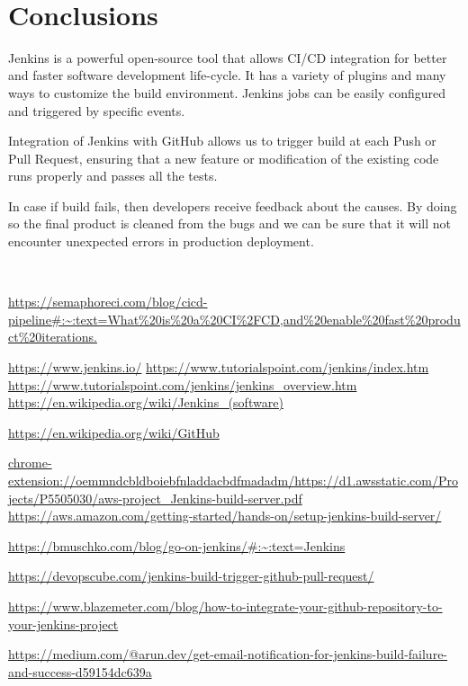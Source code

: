 \documentclass[12pt,a4paper,twoside]{article}
\begin{document}
~\newpage


\section{Conclusions}

Jenkins is a powerful open-source tool that allows CI/CD integration for better and faster software development life-cycle. It has a variety of plugins and many ways to customize the build environment. Jenkins jobs can be easily configured and triggered by specific events. 

Integration of Jenkins with GitHub allows us to trigger build at each Push or Pull Request, ensuring that a new feature or modification of the existing code runs properly and passes all the tests. 

In case if build fails, then developers receive feedback about the causes. By doing so the final product is cleaned from the bugs and we can be sure that it will not encounter unexpected errors in production deployment.


~\newpage


\begin{thebibliography}{100}

	 \url{https://semaphoreci.com/blog/cicd-pipeline#:~:text=What\%20is\%20a\%20CI\%2FCD,and\%20enable\%20fast\%20product\%20iterations.}	

	\bibitem{} \url{https://www.jenkins.io/}
	\bibitem{} \url{https://www.tutorialspoint.com/jenkins/index.htm}
	 \url{https://www.tutorialspoint.com/jenkins/jenkins_overview.htm}
	\bibitem{} \url{https://en.wikipedia.org/wiki/Jenkins_(software)}

	\bibitem{} \url{https://en.wikipedia.org/wiki/GitHub}

	\bibitem{} \url{chrome-extension://oemmndcbldboiebfnladdacbdfmadadm/https://d1.awsstatic.com/Projects/P5505030/aws-project_Jenkins-build-server.pdf}
	 \url{https://aws.amazon.com/getting-started/hands-on/setup-jenkins-build-server/}

	\bibitem{} \url{https://bmuschko.com/blog/go-on-jenkins/#:~:text=Jenkins}

	\bibitem{} \url{https://devopscube.com/jenkins-build-trigger-github-pull-request/}


	\bibitem{} \url{https://www.blazemeter.com/blog/how-to-integrate-your-github-repository-to-your-jenkins-project}

	\bibitem{} \url{https://medium.com/@arun.dev/get-email-notification-for-jenkins-build-failure-and-success-d59154dc639a}

\end{thebibliography}
\end{document}
